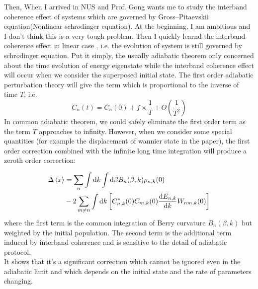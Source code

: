 \documentclass[fontsize=11pt, %
                             paper=a4, %
                             twoside, %
                             captions=tableheading,
                             index=totoc,
                             hyperref]{labbook}
\begin{document}
\begin{addmargin}[4cm]{0cm}
Then, When I arrived in NUS and Prof. Gong wants me to study the interband coherence effect of systems which are governed by Gross–Pitaevskii equation(Nonlinear schr$\ddot{o}$dinger equation). At the beginning, I am ambitious and I don't think this is a very tough problem. Then I quickly learnd the interband coherence effect in linear case \cite{PhysRevB.91.085420}, i.e. the evolution of system is still governed by schr$\ddot{o}$dinger equation. Put it simply, the usually adiabatic theorem only concerned about the time evolution of energy eigenstate while the interband coherence effect will occur when we consider the superposed initial state. The first order adiabatic perturbation theory will give the term which is proportional to the inverse of time $T$, i.e.
\begin{equation}
C_n(t)=C_n(0)+f\times\frac{1}{T}+O(\frac{1}{T^2})
\end{equation}
In common adiabatic theorem, we could safely eliminate the first order term as the term $T$ approaches to infinity. However, when we consider some special quantities (for example the displacement of wannier state in the paper\cite{PhysRevB.91.085420}), the first order correction combined with the infinite long time integration will produce a zeroth order correction:

\begin{equation}
\begin{aligned}
\Delta\left< x \right>&=\sum_n\int \mathrm{d}k \int \mathrm{d}\beta B_n(\beta,k)\rho_{n,k}(0)\\
&-2\sum_{m\neq n}\int \mathrm{d}k \left[C^\ast_{n,k}(0)C_{m,k}(0)\frac{\mathrm{d} E_{n,k} }{\mathrm{d} k}W_{nm,k}(0)\right]
\end{aligned}
\end{equation}
where the first term is the common integration of Berry curvature $B_n(\beta,k)$ but weighted by the initial population. The second term is the additional term induced by interband coherence and is sensitive to the detail of adiabatic protocol.\\
It shows that it's a significant correction which cannot be ignored even in the adiabatic limit and which depends on the initial state and the rate of parameters changing.\\


\end{addmargin}
\end{document}
